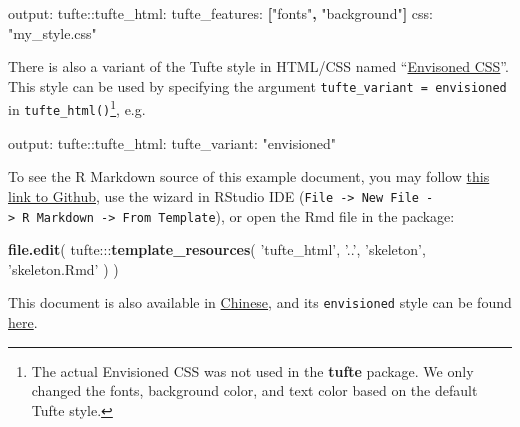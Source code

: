 \documentclass[]{tufte-handout}
\newenvironment{Shaded}{}{}
\newcommand{\KeywordTok}[1]{\textcolor[rgb]{0.00,0.44,0.13}{\textbf{#1}}}
\newcommand{\StringTok}[1]{\textcolor[rgb]{0.25,0.44,0.63}{#1}}
\newcommand{\FunctionTok}[1]{\textcolor[rgb]{0.02,0.16,0.49}{#1}}
\newcommand{\OperatorTok}[1]{\textcolor[rgb]{0.40,0.40,0.40}{#1}}
\newcommand{\AttributeTok}[1]{\textcolor[rgb]{0.49,0.56,0.16}{#1}}
\newcommand{\NormalTok}[1]{#1}
\begin{document}
\begin{Shaded}
\begin{Highlighting}[]
\FunctionTok{output:}
  \FunctionTok{tufte:}\AttributeTok{:tufte_html:}
    \FunctionTok{tufte_features:}\AttributeTok{ }\KeywordTok{[}\StringTok{"fonts"}\KeywordTok{,} \StringTok{"background"}\KeywordTok{]}
    \FunctionTok{css:}\AttributeTok{ }\StringTok{"my_style.css"}
\end{Highlighting}
\end{Shaded}

There is also a variant of the Tufte style in HTML/CSS named
``\href{http://nogginfuel.com/envisioned-css/}{Envisoned CSS}''. This
style can be used by specifying the argument
\texttt{tufte\_variant\ =\ \textquotesingle{}envisioned\textquotesingle{}}
in \texttt{tufte\_html()}\footnote{The actual Envisioned CSS was not
  used in the \textbf{tufte} package. We only changed the fonts,
  background color, and text color based on the default Tufte style.},
e.g.

\begin{Shaded}
\begin{Highlighting}[]
\FunctionTok{output:}
  \FunctionTok{tufte:}\AttributeTok{:tufte_html:}
    \FunctionTok{tufte_variant:}\AttributeTok{ }\StringTok{"envisioned"}
\end{Highlighting}
\end{Shaded}

To see the R Markdown source of this example document, you may follow
\href{https://github.com/rstudio/tufte/raw/master/inst/rmarkdown/templates/tufte_html/skeleton/skeleton.Rmd}{this
link to Github}, use the wizard in RStudio IDE
(\texttt{File\ -\textgreater{}\ New\ File\ -\textgreater{}\ R\ Markdown\ -\textgreater{}\ From\ Template}),
or open the Rmd file in the package:

\begin{Shaded}
\begin{Highlighting}[]
\KeywordTok{file.edit}\NormalTok{(}
\NormalTok{  tufte}\OperatorTok{:::}\KeywordTok{template_resources}\NormalTok{(}
    \StringTok{'tufte_html'}\NormalTok{, }\StringTok{'..'}\NormalTok{, }\StringTok{'skeleton'}\NormalTok{, }\StringTok{'skeleton.Rmd'}
\NormalTok{  )}
\NormalTok{)}
\end{Highlighting}
\end{Shaded}

This document is also available in
\href{http://rstudio.github.io/tufte/cn/}{Chinese}, and its
\texttt{envisioned} style can be found
\href{http://rstudio.github.io/tufte/envisioned/}{here}.


\end{document}
